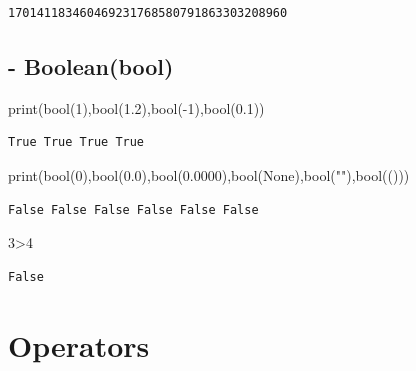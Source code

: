 \documentclass[
  letterpaper,
  DIV=11,
  numbers=noendperiod]{scrreprt}
\newenvironment{Shaded}{\begin{snugshade}}{\end{snugshade}}
\newcommand{\BuiltInTok}[1]{\textcolor[rgb]{0.00,0.23,0.31}{#1}}
\newcommand{\DecValTok}[1]{\textcolor[rgb]{0.68,0.00,0.00}{#1}}
\newcommand{\FloatTok}[1]{\textcolor[rgb]{0.68,0.00,0.00}{#1}}
\newcommand{\NormalTok}[1]{\textcolor[rgb]{0.00,0.23,0.31}{#1}}
\newcommand{\OperatorTok}[1]{\textcolor[rgb]{0.37,0.37,0.37}{#1}}
\newcommand{\StringTok}[1]{\textcolor[rgb]{0.13,0.47,0.30}{#1}}
\newcommand{\VariableTok}[1]{\textcolor[rgb]{0.07,0.07,0.07}{#1}}
\begin{document}
\begin{verbatim}
170141183460469231768580791863303208960
\end{verbatim}

\subsection{- Boolean(bool)}\label{booleanbool}

\begin{Shaded}
\begin{Highlighting}[]
\BuiltInTok{print}\NormalTok{(}\BuiltInTok{bool}\NormalTok{(}\DecValTok{1}\NormalTok{),}\BuiltInTok{bool}\NormalTok{(}\FloatTok{1.2}\NormalTok{),}\BuiltInTok{bool}\NormalTok{(}\OperatorTok{{-}}\DecValTok{1}\NormalTok{),}\BuiltInTok{bool}\NormalTok{(}\FloatTok{0.1}\NormalTok{))}
\end{Highlighting}
\end{Shaded}

\begin{verbatim}
True True True True
\end{verbatim}

\begin{Shaded}
\begin{Highlighting}[]
\BuiltInTok{print}\NormalTok{(}\BuiltInTok{bool}\NormalTok{(}\DecValTok{0}\NormalTok{),}\BuiltInTok{bool}\NormalTok{(}\FloatTok{0.0}\NormalTok{),}\BuiltInTok{bool}\NormalTok{(}\FloatTok{0.0000}\NormalTok{),}\BuiltInTok{bool}\NormalTok{(}\VariableTok{None}\NormalTok{),}\BuiltInTok{bool}\NormalTok{(}\StringTok{""}\NormalTok{),}\BuiltInTok{bool}\NormalTok{(()))}
\end{Highlighting}
\end{Shaded}

\begin{verbatim}
False False False False False False
\end{verbatim}

\begin{Shaded}
\begin{Highlighting}[]
\DecValTok{3}\OperatorTok{\textgreater{}}\DecValTok{4}
\end{Highlighting}
\end{Shaded}

\begin{verbatim}
False
\end{verbatim}

\section{Operators}\label{operators}
\end{document}
